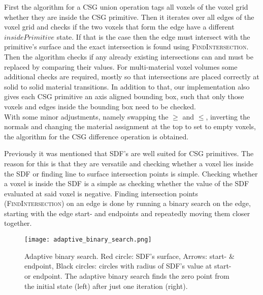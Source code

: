 First the algorithm for a CSG union operation tags all voxels of the voxel grid whether they are inside the CSG primitive. Then it iterates over all edges of the voxel grid and checks if the two voxels
that form the edge have a different $insidePrimitive$ state. If that is the case then the edge must intersect with the primitive's surface and the exact intersection is found
using \textsc{FindIntersection}. Then the algorithm checks if any already existing intersections can and must be replaced by comparing their values. For multi-material voxel volumes some additional checks are required, mostly so that intersections are placed correctly at
solid to solid material transitions. In addition to that, our implementation also gives each CSG primitive an axis aligned bounding box, such that only those voxels and edges inside the bounding box need to be checked.\\
With some minor adjustments, namely swapping the $\geq$ and $\leq$, inverting the normals and changing the material assignment at the top to set to empty voxels, the algorithm for the CSG difference operation is obtained. \par

Previously it was mentioned that SDF's are well suited for CSG primitives.
The reason for this is that they are versatile and checking whether a voxel lies inside the SDF or finding
line to surface intersection points is simple. Checking whether a voxel is inside the SDF is a simple as checking whether the value of the SDF evaluated at said voxel is negative.
Finding intersection points (\textsc{FindIntersection}) on an edge is done by running a binary search on the edge, starting with the edge start- and endpoints and repeatedly moving them closer together.

\begin{wrapfigure}{R}{0.4\textwidth}
\texttt{[image: adaptive\_binary\_search.png]}
\caption{Adaptive binary search. Red circle: SDF's surface, Arrows: start- \& endpoint, Black circles: circles with radius of SDF's value at start- or endpoint. The adaptive binary search
finds the zero point from the initial state (left) after just one iteration (right).}
\label{fig:adaptive_binary_search}
\end{wrapfigure}

